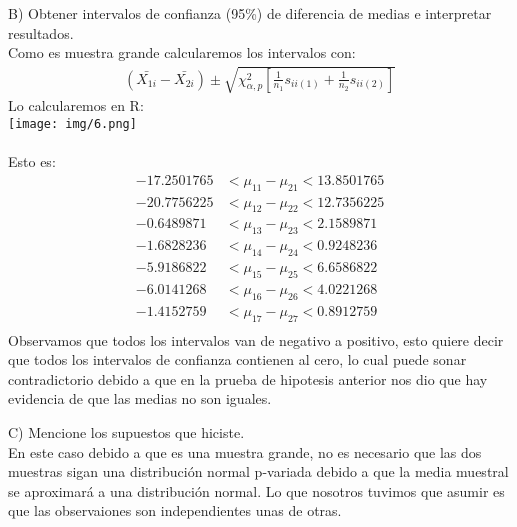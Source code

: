 \begin{sol}
\pagebreak
B) Obtener intervalos de confianza (95\%) de diferencia de medias e interpretar resultados.\\
Como es muestra grande calcularemos los intervalos con:
\begin{align*}
(\bar{X_{1i}}-\bar{X_{2i}}) \pm \sqrt{\chi_{\alpha, p}^2 \left[\frac{1}{n_1}s_{ii(1)}+\frac{1}{n_2}s_{ii(2)} \right] }
\end{align*}
Lo calcularemos en R:\\
\texttt{[image: img/6.png]}\\\\
Esto es:
\begin{align*}
-17.2501765 &< \mu_{11} - \mu_{21}< 13.8501765 \\
-20.7756225 &< \mu_{12} - \mu_{22} < 12.7356225 \\
-0.6489871  &< \mu_{13} - \mu_{23} < 2.1589871 \\
-1.6828236  &< \mu_{14} - \mu_{24} < 0.9248236 \\
-5.9186822  &< \mu_{15} - \mu_{25} < 6.6586822 \\
-6.0141268  &< \mu_{16} - \mu_{26} < 4.0221268 \\
-1.4152759  &< \mu_{17} - \mu_{27} < 0.8912759 \\
\end{align*}
Observamos que todos los intervalos van de negativo a positivo, esto quiere decir que todos los intervalos de confianza contienen al cero, lo cual puede sonar contradictorio debido a que en la prueba de hipotesis anterior nos dio que hay evidencia de que las medias no son iguales.

\pagebreak

C) Mencione los supuestos que hiciste.\\
En este caso debido a que es una muestra grande, no es necesario que las dos muestras sigan una distribución normal p-variada debido a que la media muestral se aproximará a una distribución normal. Lo que nosotros tuvimos que asumir es que las observaiones son independientes unas de otras.
\end{sol}

